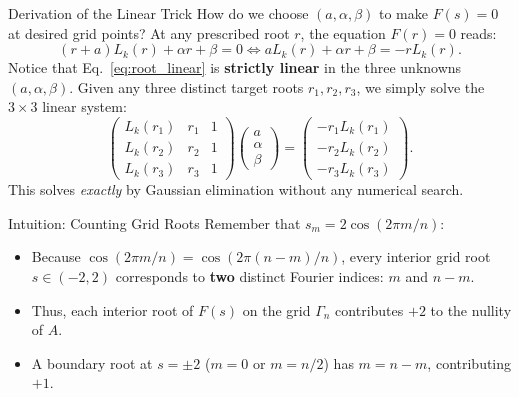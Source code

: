 \documentclass[11pt]{article}
\begin{document}
\begin{defbox}{Derivation of the Linear Trick}
How do we choose $(a, \alpha, \beta)$ to make $F(s) = 0$ at desired grid points?
At any prescribed root $r$, the equation $F(r) = 0$ reads:
\begin{equation}
  (r + a) L_k(r) + \alpha r + \beta = 0 \iff a L_k(r) + \alpha r + \beta = -r L_k(r). \label{eq:root_linear}
\end{equation}
Notice that Eq.~\eqref{eq:root_linear} is \textbf{strictly linear} in the three unknowns $(a, \alpha, \beta)$.
Given any three distinct target roots $r_1, r_2, r_3$, we simply solve the $3 \times 3$ linear system:
\begin{equation}
  \begin{pmatrix}
    L_k(r_1) & r_1 & 1 \\
    L_k(r_2) & r_2 & 1 \\
    L_k(r_3) & r_3 & 1
  \end{pmatrix}
  \begin{pmatrix} a \\ \alpha \\ \beta \end{pmatrix} =
  \begin{pmatrix} -r_1 L_k(r_1) \\ -r_2 L_k(r_2) \\ -r_3 L_k(r_3) \end{pmatrix}.
\end{equation}
This solves \emph{exactly} by Gaussian elimination without any numerical search.
\end{defbox}

\begin{intubox}{Intuition: Counting Grid Roots}
Remember that $s_m = 2\cos(2\pi m / n)$:
\begin{itemize}[leftmargin=*,nosep]
  \item Because $\cos(2\pi m / n) = \cos(2\pi (n-m) / n)$, every interior grid root $s \in (-2, 2)$ corresponds to \textbf{two} distinct Fourier indices: $m$ and $n-m$.
  \item Thus, each interior root of $F(s)$ on the grid $\Gamma_n$ contributes \textbf{$+2$} to the nullity of $A$.
  \item A boundary root at $s = \pm 2$ ($m = 0$ or $m = n/2$) has $m = n-m$, contributing \textbf{$+1$}.
\end{itemize}
\end{intubox}
\end{document}
